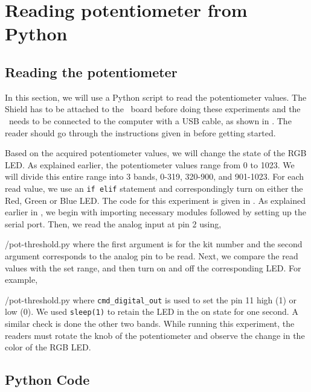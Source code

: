 \section{Reading potentiometer from Python}
\subsection{Reading the potentiometer}
In this section, we will use a Python script to read the potentiometer
values. The Shield has to be attached to the \arduino\ board
before doing these experiments and the \arduino\ needs to be connected to the computer 
with a USB cable, as shown in .
The reader should go through the instructions given in
 before getting started.

Based on the acquired potentiometer values, we will change
the state of the RGB LED. As explained earlier, the potentiometer
values range from 0 to 1023. We will divide this entire range into 3
bands, 0-319, 320-900, and 901-1023. For each read value, we use an
{\tt if elif} statement and correspondingly turn on either the Red,
Green or Blue LED. The code for this experiment is given in
. As explained earlier in , we begin with 
importing necessary modules followed by setting up the serial port. 
Then, we read the analog input at pin 2 using,

                {\LocPotpycode/pot-threshold.py} where the first
                argument is for
the kit number and the second argument corresponds to the analog pin to be read.  
Next, we compare the read values with the set range, and then turn on and off the corresponding LED. For example, 

{\LocPotpycode/pot-threshold.py} where {\tt cmd\_digital\_out} 
is used to set the pin 11 high (1) or low (0). 
We used {\tt sleep(1)} to retain the LED in the on state for one second.  
A similar check is done the other two bands. 
While running this experiment, 
the readers must rotate the knob of the potentiometer and observe 
the change in the color of the RGB LED. 


\subsection{Python Code}
\label{sec:pot-python-code}
\begin{pycode}
\label{py:pot-100}

\end{pycode}

